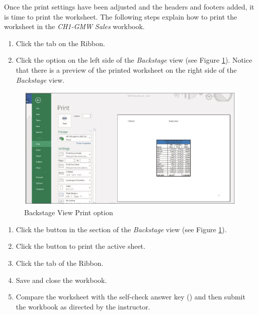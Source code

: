 Once the print settings have been adjusted and the headers and footers added, it is time to print the worksheet. The following steps explain how to print the worksheet in the \textit{CH1-GMW Sales} workbook.

\begin{enumerate}
	\item Click the  tab on the Ribbon.
	\item Click the  option on the left side of the \textit{Backstage} view (see Figure \ref{01:fig52}). Notice that there is a preview of the printed worksheet on the right side of the \textit{Backstage} view.
\end{enumerate}

\begin{figure}[H]
	\centering
	\includegraphics[width=\maxwidth{.95\linewidth}]{gfx/ch01_fig52}
	\caption{Backstage View Print option}
	\label{01:fig52}
\end{figure}

\begin{enumerate}[resume]
	\item Click the  button in the  section of the \textit{Backstage} view (see Figure \ref{01:fig52}).
	\item Click the  button to print the active sheet.
	\item Click the  tab of the Ribbon.
	\item Save and close the  workbook.
	\item Compare the worksheet with the self-check answer key () and then submit the  workbook as directed by the instructor.
\end{enumerate}

